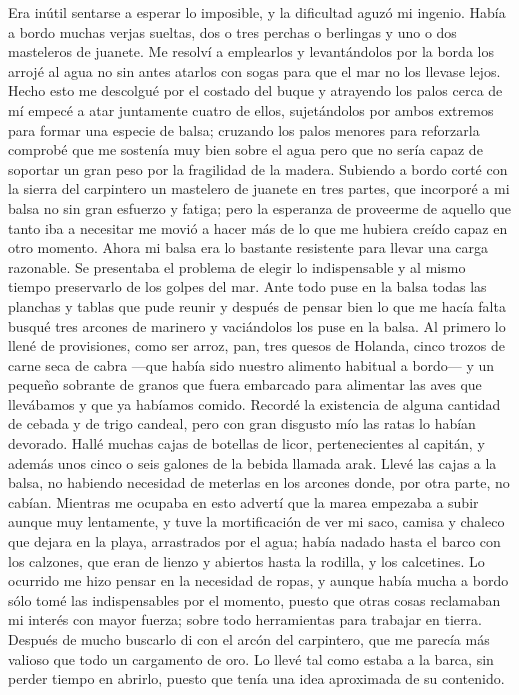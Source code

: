 \documentclass{novela}
\begin{document}
    Era inútil sentarse a esperar lo imposible, y la dificultad aguzó mi ingenio. Había a bordo muchas verjas sueltas, dos o tres perchas o berlingas y uno o dos masteleros de juanete. Me resolví a emplearlos y levantándolos por la borda los arrojé al agua no sin antes atarlos con sogas para que el mar no los llevase lejos. Hecho esto me descolgué por el costado del buque y atrayendo los palos cerca de mí empecé a atar juntamente cuatro de ellos, sujetándolos por ambos extremos para formar una especie de balsa; cruzando los palos menores para reforzarla comprobé que me sostenía muy bien sobre el agua pero que no sería capaz de soportar un gran peso por la fragilidad de la madera. Subiendo a bordo corté con la sierra del carpintero un mastelero de juanete en tres partes, que incorporé a mi balsa no sin gran esfuerzo y fatiga; pero la esperanza de proveerme de aquello que tanto iba a necesitar me movió a hacer más de lo que me hubiera creído capaz en otro momento.
    Ahora mi balsa era lo bastante resistente para llevar una carga razonable. Se presentaba el problema de elegir lo indispensable y al mismo tiempo preservarlo de los golpes del mar. Ante todo puse en la balsa todas las planchas y tablas que pude reunir y después de pensar bien lo que me hacía falta busqué tres arcones de marinero y vaciándolos los puse en la balsa. Al primero lo llené de provisiones, como ser arroz, pan, tres quesos de Holanda, cinco trozos de carne seca de cabra —que había sido nuestro alimento habitual a bordo— y un pequeño sobrante de granos que fuera embarcado para alimentar las aves que llevábamos y que ya habíamos comido. Recordé la existencia de alguna cantidad de cebada y de trigo candeal, pero con gran disgusto mío las ratas lo habían devorado. Hallé muchas cajas de botellas de licor, pertenecientes al capitán, y además unos cinco o seis galones de la bebida llamada arak. Llevé las cajas a la balsa, no habiendo necesidad de meterlas en los arcones donde, por otra parte, no cabían.
    Mientras me ocupaba en esto advertí que la marea empezaba a subir aunque muy lentamente, y tuve la mortificación de ver mi saco, camisa y chaleco que dejara en la playa, arrastrados por el agua; había nadado hasta el barco con los calzones, que eran de lienzo y abiertos hasta la rodilla, y los calcetines. Lo ocurrido me hizo pensar en la necesidad de ropas, y aunque había mucha a bordo sólo tomé las indispensables por el momento, puesto que otras cosas reclamaban mi interés con mayor fuerza; sobre todo herramientas para trabajar en tierra. Después de mucho buscarlo di con el arcón del carpintero, que me parecía más valioso que todo un cargamento de oro. Lo llevé tal como estaba a la barca, sin perder tiempo en abrirlo, puesto que tenía una idea aproximada de su contenido.
\end{document}
